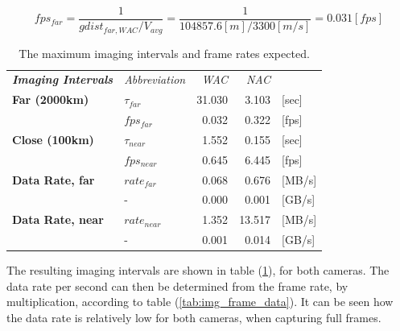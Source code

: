 \begin{equation}\label{eq:imaging_rate_calc}
fps_{far} = \frac{1}{gdist_{far,WAC}/V_{avg}} = \frac{1}{104857.6[m]/3300[m/s]} = 0.031 [fps]
\end{equation}
\begin{table}[htb]
  \centering
\begin{tabular}{l|l|r|r|l}
\textit{\textbf{Imaging Intervals}} & \textit{Abbreviation} & \multicolumn{1}{r}{\textit{WAC}} & \multicolumn{1}{r}{\textit{NAC}} &  \bigstrut[b]\\
\cline{1-4}\textbf{Far (2000km)} & $\tau_{far}$ & 31.030 & 3.103 & [sec] \bigstrut[t]\\
      & $fps_{far}$ & 0.032 & 0.322 & [fps] \bigstrut[b]\\
\cline{1-4}\textbf{Close (100km)} & $\tau_{near}$ & 1.552 & 0.155 & [sec] \bigstrut[t]\\
      & $fps_{near}$ & 0.645 & 6.445 & [fps] \bigstrut[b]\\
\cline{1-4}\textbf{Data Rate, far} & $rate_{far}$ & 0.068 & 0.676 & [MB/s] \bigstrut[t]\\
\textbf{} & -     & 0.000 & 0.001 & [GB/s] \bigstrut[b]\\
\cline{2-4}\textbf{Data Rate, near} & $rate_{near}$ & 1.352 & 13.517 & [MB/s] \bigstrut[t]\\
\textbf{} & -     & 0.001 & 0.014 & [GB/s] \\
\end{tabular}%
      \caption{The maximum imaging intervals and frame rates expected.}
  \label{tab:imaging_interval}%
\end{table}%
The resulting imaging intervals are shown in table (\ref{tab:imaging_interval}), for both cameras. The data rate per second can then be determined from the frame rate, by multiplication, according to table (\ref{tab:img_frame_data}). It can be seen how the data rate is relatively low for both cameras, when capturing full frames.

